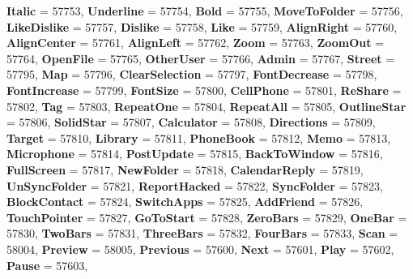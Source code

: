 \begin{DoxyCompactItemize}
{\bfseries Italic} = 57753, 
{\bfseries Underline} = 57754, 
{\bfseries Bold} = 57755, 
{\bfseries Move\+To\+Folder} = 57756, 
\newline
{\bfseries Like\+Dislike} = 57757, 
{\bfseries Dislike} = 57758, 
{\bfseries Like} = 57759, 
{\bfseries Align\+Right} = 57760, 
\newline
{\bfseries Align\+Center} = 57761, 
{\bfseries Align\+Left} = 57762, 
{\bfseries Zoom} = 57763, 
{\bfseries Zoom\+Out} = 57764, 
\newline
{\bfseries Open\+File} = 57765, 
{\bfseries Other\+User} = 57766, 
{\bfseries Admin} = 57767, 
{\bfseries Street} = 57795, 
\newline
{\bfseries Map} = 57796, 
{\bfseries Clear\+Selection} = 57797, 
{\bfseries Font\+Decrease} = 57798, 
{\bfseries Font\+Increase} = 57799, 
\newline
{\bfseries Font\+Size} = 57800, 
{\bfseries Cell\+Phone} = 57801, 
{\bfseries Re\+Share} = 57802, 
{\bfseries Tag} = 57803, 
\newline
{\bfseries Repeat\+One} = 57804, 
{\bfseries Repeat\+All} = 57805, 
{\bfseries Outline\+Star} = 57806, 
{\bfseries Solid\+Star} = 57807, 
\newline
{\bfseries Calculator} = 57808, 
{\bfseries Directions} = 57809, 
{\bfseries Target} = 57810, 
{\bfseries Library} = 57811, 
\newline
{\bfseries Phone\+Book} = 57812, 
{\bfseries Memo} = 57813, 
{\bfseries Microphone} = 57814, 
{\bfseries Post\+Update} = 57815, 
\newline
{\bfseries Back\+To\+Window} = 57816, 
{\bfseries Full\+Screen} = 57817, 
{\bfseries New\+Folder} = 57818, 
{\bfseries Calendar\+Reply} = 57819, 
\newline
{\bfseries Un\+Sync\+Folder} = 57821, 
{\bfseries Report\+Hacked} = 57822, 
{\bfseries Sync\+Folder} = 57823, 
{\bfseries Block\+Contact} = 57824, 
\newline
{\bfseries Switch\+Apps} = 57825, 
{\bfseries Add\+Friend} = 57826, 
{\bfseries Touch\+Pointer} = 57827, 
{\bfseries Go\+To\+Start} = 57828, 
\newline
{\bfseries Zero\+Bars} = 57829, 
{\bfseries One\+Bar} = 57830, 
{\bfseries Two\+Bars} = 57831, 
{\bfseries Three\+Bars} = 57832, 
\newline
{\bfseries Four\+Bars} = 57833, 
{\bfseries Scan} = 58004, 
{\bfseries Preview} = 58005, 
{\bfseries Previous} = 57600, 
\newline
{\bfseries Next} = 57601, 
{\bfseries Play} = 57602, 
{\bfseries Pause} = 57603, 

\end{DoxyCompactItemize}
